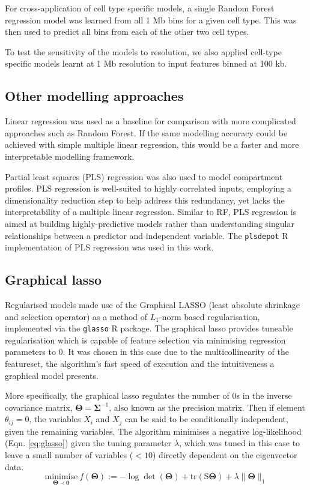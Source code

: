\documentclass[a4paper,10pt,oneside]{book}
\begin{document}
For cross-application of cell type specific models, a single Random
Forest regression model was learned from all 1 Mb bins for a given cell
type. This was then used to predict all bins from each of the other two
cell types.

To test the sensitivity of the models to resolution, we also applied cell-type specific models learnt at 1 Mb resolution to input features binned at 100 kb. 

\subsection{Other modelling approaches}
 
Linear regression was used as a baseline for comparison with more complicated approaches such as Random Forest. If the same modelling accuracy could be achieved with simple multiple linear regression, this would be a faster and more interpretable modelling framework.

Partial least squares (PLS) regression was also used to model compartment profiles. PLS regression is well-suited to highly correlated inputs, employing a dimensionality reduction step to help address this redundancy, yet lacks the interpretability of a multiple linear regression. Similar to RF, PLS regression is aimed at building highly-predictive models rather than understanding singular relationships between a predictor and independent variable.\cite{Tobias1995} The \texttt{plsdepot} R implementation of PLS regression was used in this work.

\subsection{Graphical lasso}
Regularised models made use of the Graphical LASSO\cite{Friedman2008}
(least absolute shrinkage and selection operator) as a method of
$L_1$-norm based
regularisation, implemented via the \texttt{glasso} R package. The
graphical lasso provides tuneable regularisation which is
capable of feature selection via minimising regression parameters to
0. It was chosen in this case due to the multicollinearity of the
featureset, the algorithm's fast speed of
execution and the intuitiveness a graphical model
presents.\cite{Friedman2008} 

More specifically, the graphical lasso regulates the number of 0s in
the inverse covariance matrix, $\bm{\Theta}=\bm{\Sigma}^{-1}$, also known as the
precision matrix. Then if element $\theta_{ij}=0$, the variables $X_i$ and $X_j$ can be said to be
conditionally independent, given the remaining
variables.\cite{Mazumder2012} The algorithm minimises a negative
log-likelihood (Eqn. \ref{eq:glasso}\cite{Mazumder2012}) given the tuning parameter $\lambda$, which was tuned
in this case to leave a small number of variables ($<10$)
directly dependent on the eigenvector data. \\
\begin{equation} \label{eq:glasso}
\underset{\bm{\Theta}\prec\bm{0}}{\mathrm{minimise}}~f(\bm{\Theta}) :=
-\log\det(\bm{\Theta}) + \mathrm{tr}(\bm{\mathrm{S}\Theta}) + \lambda
\lVert\bm{\Theta}\rVert_1
\end{equation}
\end{document}
